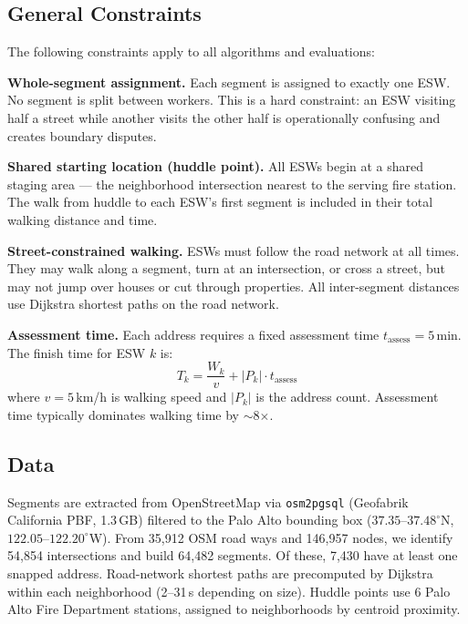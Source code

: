 \documentclass[conference]{IEEEtran}
\begin{document}
\subsection{General Constraints}

The following constraints apply to all algorithms and evaluations:

\textbf{Whole-segment assignment.} Each segment is assigned to exactly one ESW. No segment is split between workers. This is a hard constraint: an ESW visiting half a street while another visits the other half is operationally confusing and creates boundary disputes.

\textbf{Shared starting location (huddle point).} All ESWs begin at a shared staging area --- the neighborhood intersection nearest to the serving fire station. The walk from huddle to each ESW's first segment is included in their total walking distance and time.

\textbf{Street-constrained walking.} ESWs must follow the road network at all times. They may walk along a segment, turn at an intersection, or cross a street, but may not jump over houses or cut through properties. All inter-segment distances use Dijkstra shortest paths on the road network.

\textbf{Assessment time.} Each address requires a fixed assessment time $t_{\text{assess}} = 5$\,min. The finish time for ESW $k$ is:
\begin{equation}
T_k = \frac{W_k}{v} + |P_k| \cdot t_{\text{assess}}
\label{eq:finish-time}
\end{equation}
where $v = 5$\,km/h is walking speed and $|P_k|$ is the address count. Assessment time typically dominates walking time by $\sim$8$\times$.

\subsection{Data}

Segments are extracted from OpenStreetMap via \texttt{osm2pgsql} (Geofabrik California PBF, 1.3\,GB) filtered to the Palo Alto bounding box ($37.35$--$37.48^\circ$N, $122.05$--$122.20^\circ$W). From 35,912 OSM road ways and 146,957 nodes, we identify 54,854 intersections and build 64,482 segments. Of these, 7,430 have at least one snapped address. Road-network shortest paths are precomputed by Dijkstra within each neighborhood (2--31\,s depending on size). Huddle points use 6 Palo Alto Fire Department stations, assigned to neighborhoods by centroid proximity.
\end{document}
